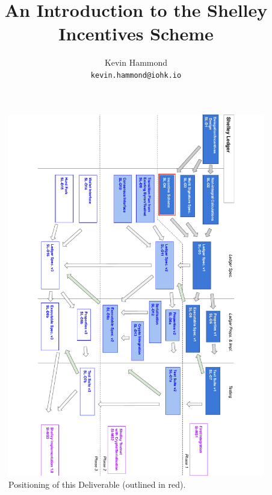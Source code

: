 \documentclass[11pt,a4paper,dvipsnames,twosided,final]{article}
\begin{document}
\begin{landscape}
\begin{figure}
\includegraphics[scale=0.8,angle=90]{d4-depends.pdf}
\caption{Positioning of this Deliverable (outlined in red).}
\end{figure}
\end{landscape}
\pagestyle{empty}
\cleardoublepage

\title{An Introduction to the Shelley Incentives Scheme}

\author{Kevin Hammond  \\ {\small \texttt{kevin.hammond@iohk.io}}}

\maketitle
\end{document}
